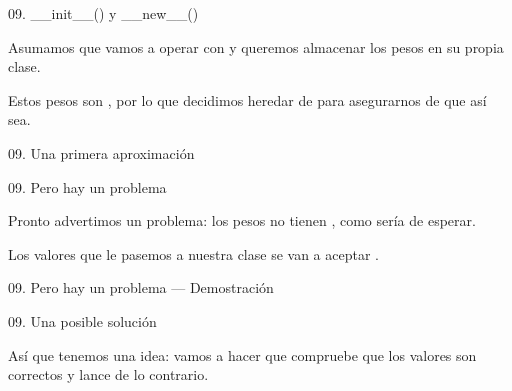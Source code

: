 
\begin{frame}{09. \_\_init\_\_() y \_\_new\_\_()}
  \begin{block}{}
    \centering
    Asumamos que vamos a operar con  y
    queremos almacenar los pesos en su propia clase.
  \end{block}

  \begin{center}
    \small
    Estos pesos son , por lo que decidimos
    heredar de  para asegurarnos de que así sea.
  \end{center}
\end{frame}

\begin{frame}{09. Una primera aproximación}
\end{frame}

\begin{frame}{09. Pero hay un problema}
  \begin{alertblock}{}
    \centering
    Pronto advertimos un problema: los pesos no tienen , como sería de esperar.
  \end{alertblock}

  \begin{center}
    Los valores que le pasemos a nuestra clase se van a aceptar
    .
  \end{center}
\end{frame}

\begin{frame}
  {\Large 09. Pero hay un problema — Demostración}
\end{frame}

\begin{frame}{09. Una posible solución}
  \begin{block}{}
    \centering
    Así que tenemos una idea: vamos a hacer que
     compruebe que los valores son
      correctos y lance  de lo contrario.
  \end{block}
\end{frame}


